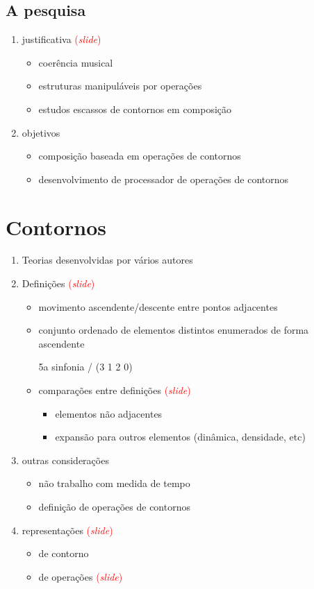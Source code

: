 \documentclass[12pt,a4paper]{article}
\newcommand{\slide}{\textcolor{red}{(\textit{slide})}}
\begin{document}
\subsection{A pesquisa}

\begin{enumerate}
\item justificativa \slide{}
  \begin{itemize}
  \item coerência musical
  \item estruturas manipuláveis por operações
  \item estudos escassos de contornos em composição
  \end{itemize}
\item objetivos
  \begin{itemize}
  \item composição baseada em operações de contornos
  \item desenvolvimento de processador de operações de contornos
  \end{itemize}
\end{enumerate}

\section{Contornos}

\begin{enumerate}
\item Teorias desenvolvidas por vários autores
\item Definições \slide{}
  \begin{itemize}
  \item movimento ascendente/descente entre pontos adjacentes 

  \item conjunto ordenado de elementos distintos enumerados de forma
    ascendente

    5a sinfonia / (3 1 2 0)
  \item comparações entre definições \slide{}
    \begin{itemize}
    \item elementos não adjacentes
    \item expansão para outros elementos (dinâmica, densidade, etc)
    \end{itemize}
  \end{itemize}
\item outras considerações
  \begin{itemize}
  \item não trabalho com medida de tempo
  \item definição de operações de contornos
  \end{itemize}
\item representações \slide{}
  \begin{itemize}
  \item de contorno
  \item de operações \slide{}
  \end{itemize}
\end{enumerate}
\end{document}
